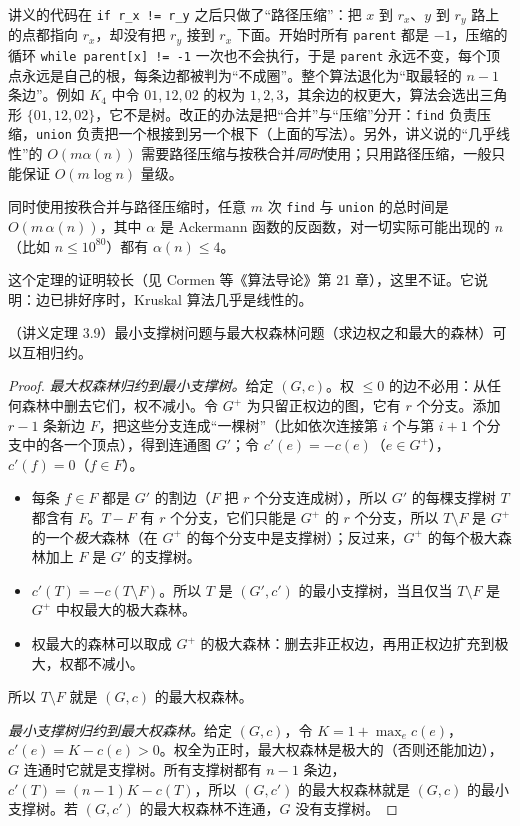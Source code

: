 \begin{remark}
讲义的代码在 \texttt{if r\_x != r\_y} 之后只做了“路径压缩”：把 $x$ 到 $r_x$、$y$ 到 $r_y$ 路上的点都指向 $r_x$，却没有把 $r_y$ 接到 $r_x$ 下面。开始时所有 \texttt{parent} 都是 $-1$，压缩的循环 \texttt{while parent[x] != -1} 一次也不会执行，于是 \texttt{parent} 永远不变，每个顶点永远是自己的根，每条边都被判为“不成圈”。整个算法退化为“取最轻的 $n-1$ 条边”。例如 $K_4$ 中令 $01,12,02$ 的权为 $1,2,3$，其余边的权更大，算法会选出三角形 $\{01,12,02\}$，它不是树。改正的办法是把“合并”与“压缩”分开：\texttt{find} 负责压缩，\texttt{union} 负责把一个根接到另一个根下（上面的写法）。另外，讲义说的“几乎线性”的 $O(m\alpha(n))$ 需要路径压缩与按秩合并\emph{同时}使用；只用路径压缩，一般只能保证 $O(m\log n)$ 量级。
\end{remark}

\begin{theorem}[Tarjan]\label{thm:mst-kruskal:tarjan}
同时使用按秩合并与路径压缩时，任意 $m$ 次 \texttt{find} 与 \texttt{union} 的总时间是 $O(m\,\alpha(n))$，其中 $\alpha$ 是 Ackermann 函数的反函数，对一切实际可能出现的 $n$（比如 $n\leqslant10^{80}$）都有 $\alpha(n)\leqslant4$。
\end{theorem}

这个定理的证明较长（见 Cormen 等《算法导论》第 21 章），这里不证。它说明：边已排好序时，Kruskal 算法几乎是线性的。


\begin{theorem}\label{thm:mst-kruskal:forest}
（讲义定理 3.9）最小支撑树问题与最大权森林问题（求边权之和最大的森林）可以互相归约。
\end{theorem}
\begin{proof}
\emph{最大权森林归约到最小支撑树。}给定 $(G,c)$。权 $\leqslant0$ 的边不必用：从任何森林中删去它们，权不减小。令 $G^+$ 为只留正权边的图，它有 $r$ 个分支。添加 $r-1$ 条新边 $F$，把这些分支连成“一棵树”（比如依次连接第 $i$ 个与第 $i+1$ 个分支中的各一个顶点），得到连通图 $G'$；令 $c'(e)=-c(e)$（$e\in G^+$），$c'(f)=0$（$f\in F$）。
\begin{itemize}
\item 每条 $f\in F$ 都是 $G'$ 的割边（$F$ 把 $r$ 个分支连成树），所以 $G'$ 的每棵支撑树 $T$ 都含有 $F$。$T-F$ 有 $r$ 个分支，它们只能是 $G^+$ 的 $r$ 个分支，所以 $T\setminus F$ 是 $G^+$ 的一个\emph{极大}森林（在 $G^+$ 的每个分支中是支撑树）；反过来，$G^+$ 的每个极大森林加上 $F$ 是 $G'$ 的支撑树。
\item $c'(T)=-c(T\setminus F)$。所以 $T$ 是 $(G',c')$ 的最小支撑树，当且仅当 $T\setminus F$ 是 $G^+$ 中权最大的极大森林。
\item 权最大的森林可以取成 $G^+$ 的极大森林：删去非正权边，再用正权边扩充到极大，权都不减小。
\end{itemize}
所以 $T\setminus F$ 就是 $(G,c)$ 的最大权森林。

\emph{最小支撑树归约到最大权森林。}给定 $(G,c)$，令 $K=1+\max_ec(e)$，$c'(e)=K-c(e)>0$。权全为正时，最大权森林是极大的（否则还能加边），$G$ 连通时它就是支撑树。所有支撑树都有 $n-1$ 条边，$c'(T)=(n-1)K-c(T)$，所以 $(G,c')$ 的最大权森林就是 $(G,c)$ 的最小支撑树。若 $(G,c')$ 的最大权森林不连通，$G$ 没有支撑树。
\end{proof}

